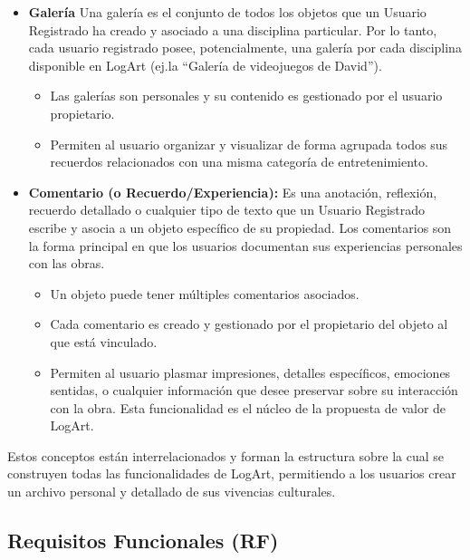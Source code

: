 \begin{itemize}
    \vspace{0.5cm}

    \item \textbf{Galería} Una galería es el conjunto de todos los objetos que un Usuario Registrado ha creado y asociado a una disciplina particular. Por lo tanto, cada usuario registrado posee, potencialmente, una galería por cada disciplina disponible en LogArt (ej.la ``Galería de videojuegos de David''). 
    \begin{itemize}
        \item Las galerías son personales y su contenido es gestionado por el usuario propietario.
        \item Permiten al usuario organizar y visualizar de forma agrupada todos sus recuerdos relacionados con una misma categoría de entretenimiento.
    \end{itemize}

    \vspace{0.5cm}

    \item \textbf{Comentario (o Recuerdo/Experiencia):} Es una anotación, reflexión, recuerdo detallado o cualquier tipo de texto que un Usuario Registrado escribe y asocia a un objeto específico de su propiedad. Los comentarios son la forma principal en que los usuarios documentan sus experiencias personales con las obras.
    \begin{itemize}
        \item Un objeto puede tener múltiples comentarios asociados.
        \item Cada comentario es creado y gestionado por el propietario del objeto al que está vinculado.
        \item Permiten al usuario plasmar impresiones, detalles específicos, emociones sentidas, o cualquier información que desee preservar sobre su interacción con la obra. Esta funcionalidad es el núcleo de la propuesta de valor de LogArt.
    \end{itemize}
\end{itemize}

Estos conceptos están interrelacionados y forman la estructura sobre la cual se construyen todas las funcionalidades de LogArt, permitiendo a los usuarios crear un archivo personal y detallado de sus vivencias culturales.

\subsection{Requisitos Funcionales (RF)}
\label{ssec:requisitosFuncionales}

